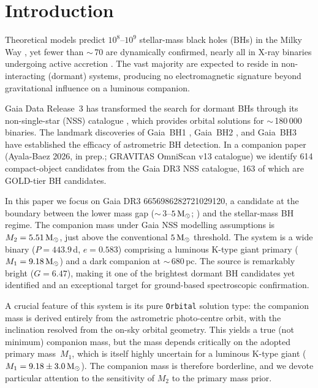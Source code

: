 \documentclass[usenatbib,fleqn]{mnras}
\newcommand{\Msun}{{\rm M}_\odot}
\begin{document}
\section{Introduction}
\label{sec:intro}

Theoretical models predict $10^8$--$10^9$ stellar-mass black holes
(BHs) in the Milky Way \citep{AgolKamionkowski2002, Shapiro1983},
yet fewer than $\sim$\,70 are dynamically confirmed, nearly all in
X-ray binaries undergoing active accretion
\citep{RemillardMcClintock2006}.  The vast majority are expected to
reside in non-interacting (dormant) systems, producing no
electromagnetic signature beyond gravitational influence on a
luminous companion.

Gaia Data Release~3 \citep[DR3;][]{GaiaCollaboration2023} has
transformed the search for dormant BHs through its non-single-star
(NSS) catalogue \citep{GaiaNSS2023}, which provides orbital
solutions for $\sim$\,180\,000 binaries.  The landmark discoveries
of Gaia~BH1
\citep[$M_2 \approx 9.6\,\Msun$;][]{ElBadry2023a}, Gaia~BH2
\citep[$M_2 \approx 8.9\,\Msun$;][]{ElBadry2023b}, and Gaia~BH3
\citep[$M_2 \approx 33\,\Msun$;][]{GaiaBH3_2024} have established
the efficacy of astrometric BH detection.  In a companion paper
(Ayala-Baez 2026, in prep.; GRAVITAS OmniScan v13 catalogue) we
identify 614 compact-object candidates from the Gaia DR3 NSS
catalogue, 163 of which are GOLD-tier BH candidates.

In this paper we focus on Gaia DR3 6656986282721029120, a candidate
at the boundary between the lower mass gap
($\sim$\,$3$--$5\,\Msun$; \citealt{Bailyn1998, Ozel2010,
Farr2011}) and the stellar-mass BH regime.  The companion mass
under Gaia NSS modelling assumptions is $M_2 = 5.51\,\Msun$, just
above the conventional $5\,\Msun$ threshold.  The system is a wide
binary ($P = 443.9$\,d, $e = 0.583$) comprising a luminous K-type
giant primary ($M_1 = 9.18\,\Msun$) and a dark companion at
$\sim$\,$680$\,pc.  The source is remarkably bright ($G = 6.47$),
making it one of the brightest dormant BH candidates yet identified
and an exceptional target for ground-based spectroscopic
confirmation.

A crucial feature of this system is its pure \texttt{Orbital}
solution type: the companion mass is derived entirely from the
astrometric photo-centre orbit, with the inclination resolved from
the on-sky orbital geometry.  This yields a true (not minimum)
companion mass, but the mass depends critically on the adopted
primary mass~$M_1$, which is itself highly uncertain for a
luminous K-type giant ($M_1 = 9.18 \pm 3.0\,\Msun$).  The
companion mass is therefore borderline, and we devote particular
attention to the sensitivity of $M_2$ to the primary mass prior.
\end{document}
